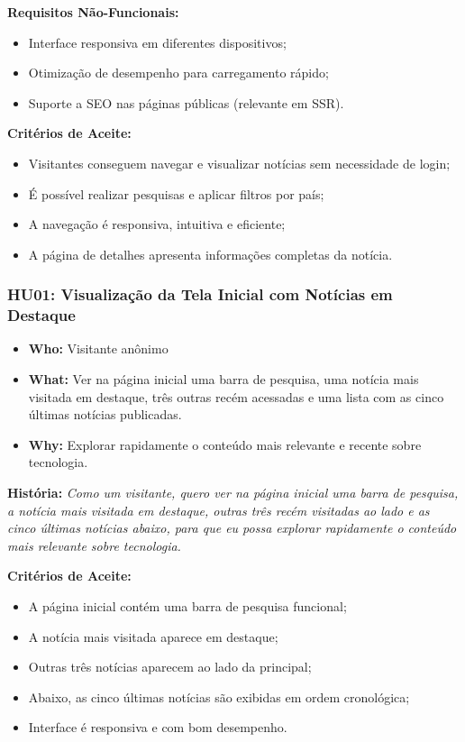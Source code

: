 \noindent \textbf{Requisitos Não-Funcionais:}
\begin{itemize}
  \item Interface responsiva em diferentes dispositivos;
  \item Otimização de desempenho para carregamento rápido;
  \item Suporte a SEO nas páginas públicas (relevante em SSR).
\end{itemize}

\noindent \textbf{Critérios de Aceite:}
\begin{itemize}
  \item Visitantes conseguem navegar e visualizar notícias sem necessidade de login;
  \item É possível realizar pesquisas e aplicar filtros por país;
  \item A navegação é responsiva, intuitiva e eficiente;
  \item A página de detalhes apresenta informações completas da notícia.
\end{itemize}

\subsubsection*{HU01: Visualização da Tela Inicial com Notícias em Destaque}

\begin{itemize}
  \item \textbf{Who:} Visitante anônimo
  \item \textbf{What:} Ver na página inicial uma barra de pesquisa, uma notícia mais visitada em destaque, três outras recém acessadas e uma lista com as cinco últimas notícias publicadas.
  \item \textbf{Why:} Explorar rapidamente o conteúdo mais relevante e recente sobre tecnologia.
\end{itemize}

\noindent \textbf{História:} \textit{Como um visitante, quero ver na página inicial uma barra de pesquisa, a notícia mais visitada em destaque, outras três recém visitadas ao lado e as cinco últimas notícias abaixo, para que eu possa explorar rapidamente o conteúdo mais relevante sobre tecnologia.}

\noindent \textbf{Critérios de Aceite:}
\begin{itemize}
  \item A página inicial contém uma barra de pesquisa funcional;
  \item A notícia mais visitada aparece em destaque;
  \item Outras três notícias aparecem ao lado da principal;
  \item Abaixo, as cinco últimas notícias são exibidas em ordem cronológica;
  \item Interface é responsiva e com bom desempenho.
\end{itemize}

